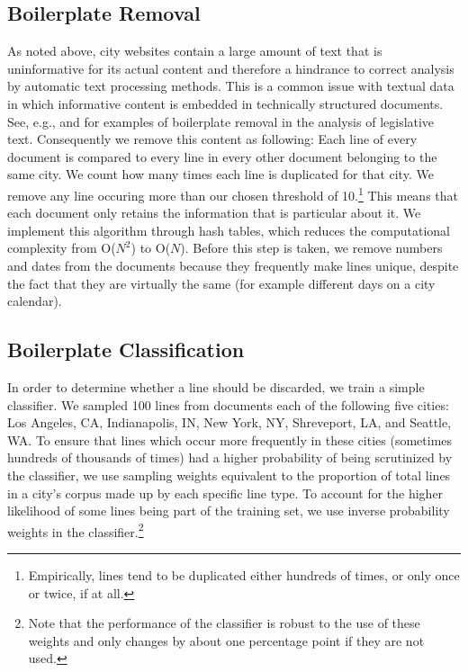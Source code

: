 \documentclass[11pt]{article}
\begin{document}
\subsection{Boilerplate Removal}\label{boilerplate}
As noted above, city websites contain a large amount of text that is uninformative for its actual content and therefore a hindrance to correct analysis by automatic text processing methods. This is a common issue with textual data in which informative content is embedded in technically structured documents. See, e.g., \citet{burgess2016legislative,wilkerson2015tracing} and \citet{linder2018text} for examples of boilerplate removal in the analysis of legislative text. Consequently we remove this content as following: Each line of every document is compared to every line in every other document belonging to the same city. We count how many times each line is duplicated for that city. We remove any line occuring more than our chosen threshold of 10.\footnote{Empirically, lines tend to be duplicated either hundreds of times, or only once or twice, if at all.} This means that each document only retains the information that is particular about it. We implement this algorithm through hash tables, which reduces the computational complexity from O($N^2$) to O($N$). Before this step is taken, we remove numbers and dates from the documents because they frequently make lines unique, despite the fact that they are virtually the same (for example different days on a city calendar).

\subsection*{Boilerplate Classification}
In order to determine whether a line should be discarded, we train a simple classifier. We sampled 100 lines from documents each of the following five cities: Los Angeles, CA, Indianapolis, IN, New York, NY, Shreveport, LA, and Seattle, WA. To ensure that lines which occur more frequently in these cities (sometimes hundreds of thousands of times) had a higher probability of being scrutinized by the classifier, we use sampling weights equivalent to the proportion of total lines in a city's corpus made up by each specific line type. To account for the higher likelihood of some lines being part of the training set, we use inverse probability weights in the classifier.\footnote{Note that the performance of the classifier is robust to the use of these weights and only changes by about one percentage point if they are not used.}
\end{document}
